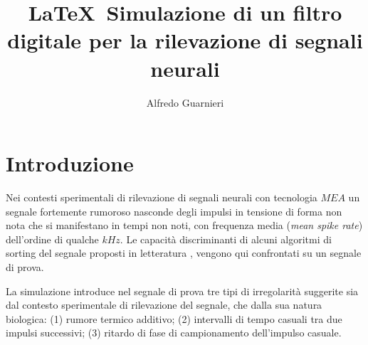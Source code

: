 \documentclass[9pt,twocolumn,twoside]{osajnl}
\title{\LaTeX\  Simulazione di un filtro digitale per la rilevazione di segnali neurali \emph{ }}
\author[1]{Alfredo Guarnieri}
\begin{document}
\maketitle



\section{Introduzione}

Nei contesti sperimentali di rilevazione di segnali neurali con tecnologia $MEA$ un segnale fortemente rumoroso nasconde degli impulsi in tensione di forma non nota che si manifestano in tempi non noti, con frequenza media
({\it mean spike rate}) dell'ordine di qualche $kHz$. Le capacità discriminanti di alcuni algoritmi di sorting del segnale proposti in letteratura
\cite{Vallicelli2017}, \cite{Lambacher2011} vengono  qui confrontati su un segnale di prova.

La simulazione introduce nel segnale di prova tre tipi di irregolarità suggerite sia dal contesto sperimentale di rilevazione del segnale, che dalla sua natura biologica: (1) rumore termico additivo; (2) intervalli di tempo casuali tra due impulsi successivi; (3) ritardo di fase di campionamento dell'impulso casuale.
\end{document}
